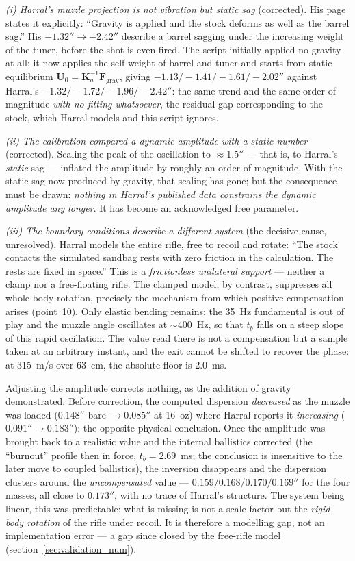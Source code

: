 \documentclass[12pt,a4paper]{article}
\begin{document}
	\emph{(i) Harral's muzzle projection is not vibration but static sag} (corrected). His page states it explicitly: ``Gravity is applied and the stock deforms as well as the barrel sag.'' His $-1.32''\to-2.42''$ describe a barrel sagging under the increasing weight of the tuner, before the shot is even fired. The script initially applied no gravity at all; it now applies the self-weight of barrel and tuner and starts from static equilibrium $\mathbf{U}_0 = \mathbf{K}_a^{-1}\mathbf{F}_\text{grav}$, giving $-1.13 / -1.41 / -1.61 / -2.02''$ against Harral's $-1.32 / -1.72 / -1.96 / -2.42''$: the same trend and the same order of magnitude \emph{with no fitting whatsoever}, the residual gap corresponding to the stock, which Harral models and this script ignores.

	\emph{(ii) The calibration compared a dynamic amplitude with a static number} (corrected). Scaling the peak of the oscillation to $\approx 1.5''$ --- that is, to Harral's \emph{static} sag --- inflated the amplitude by roughly an order of magnitude. With the static sag now produced by gravity, that scaling has gone; but the consequence must be drawn: \emph{nothing in Harral's published data constrains the dynamic amplitude any longer}. It has become an acknowledged free parameter.

	\emph{(iii) The boundary conditions describe a different system} (the decisive cause, unresolved). Harral models the entire rifle, free to recoil and rotate: ``The stock contacts the simulated sandbag rests with zero friction in the calculation. The rests are fixed in space.'' This is a \emph{frictionless unilateral support} --- neither a clamp nor a free-floating rifle. The clamped model, by contrast, suppresses all whole-body rotation, precisely the mechanism from which positive compensation arises (point~10). Only elastic bending remains: the 35~Hz fundamental is out of play and the muzzle angle oscillates at $\sim 400$~Hz, so that $t_b$ falls on a steep slope of this rapid oscillation. The value read there is not a compensation but a sample taken at an arbitrary instant, and the exit cannot be shifted to recover the phase: at 315~m/s over 63~cm, the absolute floor is 2.0~ms.

	Adjusting the amplitude corrects nothing, as the addition of gravity demonstrated. Before correction, the computed dispersion \emph{decreased} as the muzzle was loaded ($0.148''$ bare $\to 0.085''$ at 16~oz) where Harral reports it \emph{increasing} ($0.091'' \to 0.183''$): the opposite physical conclusion. Once the amplitude was brought back to a realistic value and the internal ballistics corrected (the ``burnout'' profile then in force, $t_b = 2.69$~ms; the conclusion is insensitive to the later move to coupled ballistics), the inversion disappears and the dispersion clusters around the \emph{uncompensated} value --- $0.159 / 0.168 / 0.170 / 0.169''$ for the four masses, all close to $0.173''$, with no trace of Harral's structure. The system being linear, this was predictable: what is missing is not a scale factor but the \emph{rigid-body rotation} of the rifle under recoil. It is therefore a modelling gap, not an implementation error --- a gap since closed by the free-rifle model (section~\ref{sec:validation_num}).
\end{document}
